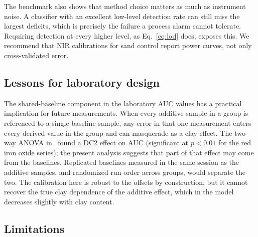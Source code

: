 \documentclass[10pt,twocolumn,letterpaper]{article}
\begin{document}
The benchmark also shows that method choice matters as much as instrument noise. A classifier with an excellent low-level detection rate can still miss the largest deficits, which is precisely the failure a process alarm cannot tolerate. Requiring detection at every higher level, as Eq.~\eqref{eq:lod} does, exposes this. We recommend that NIR calibrations for sand control report power curves, not only cross-validated error.

\subsection{Lessons for laboratory design}

The shared-baseline component in the laboratory AUC values has a practical implication for future measurements. When every additive sample in a group is referenced to a single baseline sample, any error in that one measurement enters every derived value in the group and can masquerade as a clay effect. The two-way ANOVA in~\cite{kuubata2025} found a DC2 effect on AUC (significant at $p<0.01$ for the red iron oxide series); the present analysis suggests that part of that effect may come from the baselines. Replicated baselines measured in the same session as the additive samples, and randomized run order across groups, would separate the two. The calibration here is robust to the offsets by construction, but it cannot recover the true clay dependence of the additive effect, which in the model decreases slightly with clay content.

\subsection{Limitations}\label{sec:limits}
\end{document}
